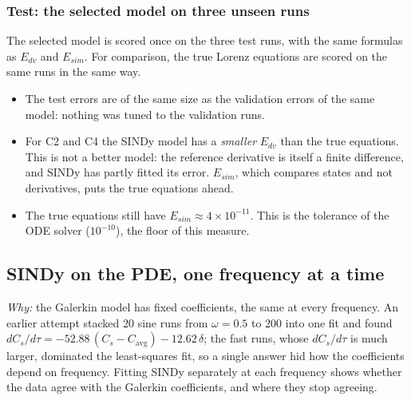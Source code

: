 \documentclass[11pt,a4paper]{article}
\newcommand{\why}{\textit{Why:} }
\newcommand{\avg}{\mathrm{avg}}
\begin{document}
\subsubsection{Test: the selected model on three unseen runs}
The selected model is scored once on the three test runs, with the same formulas as $E_{dv}$ and $E_{sim}$. For comparison, the true Lorenz equations are scored on the same runs in the same way.
\begin{table}[H]\centering\small

\caption{Test errors (fractions), mean over the three test runs.}
\end{table}
\begin{itemize}
  \item The test errors are of the same size as the validation errors of the same model: nothing was tuned to the validation runs.
  \item For C2 and C4 the SINDy model has a \emph{smaller} $E_{dv}$ than the true equations. This is not a better model: the reference derivative is itself a finite difference, and SINDy has partly fitted its error. $E_{sim}$, which compares states and not derivatives, puts the true equations ahead.
  \item The true equations still have $E_{sim}\approx 4\times10^{-11}$. This is the tolerance of the ODE solver ($10^{-10}$), the floor of this measure.
\end{itemize}

\subsection{SINDy on the PDE, one frequency at a time}
\why the Galerkin model has fixed coefficients, the same at every frequency. An earlier attempt stacked 20 sine runs from $\omega=0.5$ to 200 into one fit and found $dC_s/d\tau=-52.88\,(C_s-C_\avg)-12.62\,\delta$; the fast runs, whose $dC_s/d\tau$ is much larger, dominated the least-squares fit, so a single answer hid how the coefficients depend on frequency. Fitting SINDy separately at each frequency shows whether the data agree with the Galerkin coefficients, and where they stop agreeing.
\end{document}
